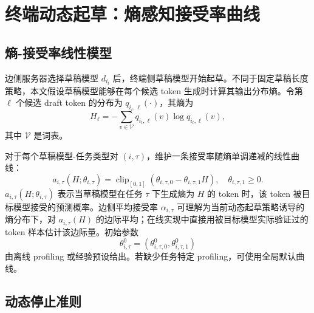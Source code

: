 \documentclass[11pt,a4paper]{ctexart}
\newcommand{\clip}{\operatorname{clip}}
\begin{document}
\section{终端动态起草：熵感知接受率曲线}
\label{sec:entropy_drafting}

\subsection{熵-接受率线性模型}
\label{subsec:entropy_curve}

边侧服务器选择草稿模型 $d_{i_t}$ 后，终端侧草稿模型开始起草。不同于固定草稿长度策略，本文假设草稿模型能够在每个候选 token 生成时计算其输出分布熵。令第 $\ell$ 个候选 draft token 的分布为 $q_{i_t,\ell}(\cdot)$，其熵为
\begin{equation}
    H_\ell
    =
    -\sum_{v\in\mathcal{V}}
    q_{i_t,\ell}(v)\log q_{i_t,\ell}(v),
    \label{eq:token_entropy}
\end{equation}
其中 $\mathcal{V}$ 是词表。

对于每个草稿模型-任务类型对 $(i,\tau)$，维护一条接受率随熵单调递减的线性曲线：
\begin{equation}
    a_{i,\tau}(H;\theta_{i,\tau})
    =
    \clip_{[0,1]}
    \left(
    \theta_{i,\tau,0}
    -
    \theta_{i,\tau,1}H
    \right),
    \quad
    \theta_{i,\tau,1}\geq 0.
    \label{eq:entropy_acceptance_curve}
\end{equation}
$a_{i,\tau}(H;\theta_{i,\tau})$ 表示当草稿模型在任务 $\tau$ 下生成熵为 $H$ 的 token 时，该 token 被目标模型接受的预测概率。边侧平均接受率 $\alpha_{i,\tau}$ 可理解为当前动态起草策略诱导的熵分布下，对 $a_{i,\tau}(H)$ 的边际平均；在线实现中直接用被目标模型实际验证过的 token 样本估计该边际量。初始参数
\begin{equation}
    \theta_{i,\tau}^{0}
    =
    (\theta_{i,\tau,0}^{0},\theta_{i,\tau,1}^{0})
\end{equation}
由离线 profiling 或经验预设给出。若缺少任务特定 profiling，可使用全局默认曲线。

\subsection{动态停止准则}
\label{subsec:dynamic_stop}
\end{document}
